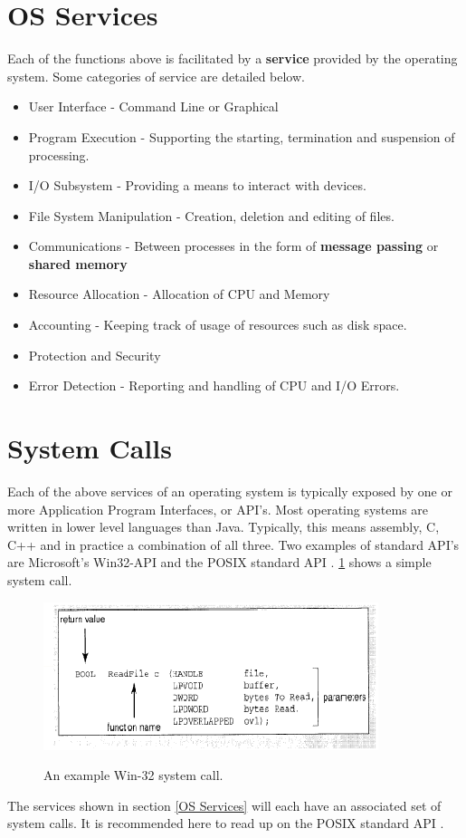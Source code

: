 \documentclass[10pt,a4paper]{article}
\begin{document}
\section{OS Services}
Each of the functions above is facilitated by a {\bf service} provided by the operating system. Some categories of service are detailed below. 
\begin{itemize}
\item User Interface - Command Line or Graphical
\item Program Execution - Supporting the starting, termination and suspension of processing. 
\item I/O Subsystem - Providing a means to interact with devices.  
\item File System Manipulation - Creation, deletion and editing of files.
\item Communications - Between processes in the form of {\bf message passing} or {\bf shared memory}
\item Resource Allocation - Allocation of CPU and Memory
\item Accounting - Keeping track of usage of resources such as disk space. 
\item Protection and Security
\item Error Detection - Reporting and handling of CPU and I/O Errors. 
\end{itemize}
\section{System Calls}
Each of the above services of an operating system is typically exposed by one or more Application Program Interfaces, or API's. Most operating systems are written in lower level languages than Java. Typically, this means assembly, C, C++ and in practice a combination of all three. Two examples of standard API's are Microsoft's Win32-API \cite{WIN32API} and the POSIX standard API \cite{POSIXAPI}. \ref{systemcall} shows a simple system call. 
\begin{figure}
\caption{An example Win-32 system call. \cite{OSCONCEPTS}}
\begin{center}
\includegraphics[scale=0.45]{../images/system-call.png}
\label{systemcall}
\end{center}
\end{figure}
The services shown in section \ref{OS Services} will each have an associated set of system calls. It is recommended here to read up on the POSIX standard API \cite{POSIXAPI}.
\end{document}

